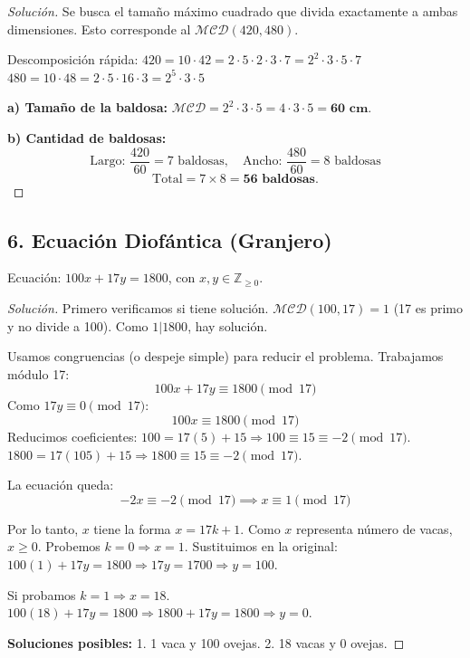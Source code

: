 \documentclass[12pt, letterpaper]{article}
\newenvironment{solucion}
    {\begin{proof}[Solución]}
    {\end{proof}}
\begin{document}
\begin{solucion}
    Se busca el tamaño máximo cuadrado que divida exactamente a ambas dimensiones. Esto corresponde al $\mathcal{MCD}(420, 480)$.
    
    Descomposición rápida:
    $420 = 10 \cdot 42 = 2 \cdot 5 \cdot 2 \cdot 3 \cdot 7 = 2^2 \cdot 3 \cdot 5 \cdot 7$
    $480 = 10 \cdot 48 = 2 \cdot 5 \cdot 16 \cdot 3 = 2^5 \cdot 3 \cdot 5$
    
    \textbf{a) Tamaño de la baldosa:}
    $\mathcal{MCD} = 2^2 \cdot 3 \cdot 5 = 4 \cdot 3 \cdot 5 = \mathbf{60 \text{ cm}}$.
    
    \textbf{b) Cantidad de baldosas:}
    \[ \text{Largo: } \frac{420}{60} = 7 \text{ baldosas}, \quad \text{Ancho: } \frac{480}{60} = 8 \text{ baldosas} \]
    \[ \text{Total} = 7 \times 8 = \mathbf{56 \text{ baldosas}}. \]
\end{solucion}

\subsection*{6. Ecuación Diofántica (Granjero)}
Ecuación: $100x + 17y = 1800$, con $x, y \in \mathbb{Z}_{\ge 0}$.

\begin{solucion}
    Primero verificamos si tiene solución. $\mathcal{MCD}(100, 17) = 1$ (17 es primo y no divide a 100). Como $1 | 1800$, hay solución.
    
    Usamos congruencias (o despeje simple) para reducir el problema. Trabajamos módulo 17:
    \[ 100x + 17y \equiv 1800 \pmod{17} \]
    Como $17y \equiv 0 \pmod{17}$:
    \[ 100x \equiv 1800 \pmod{17} \]
    Reducimos coeficientes:
    $100 = 17(5) + 15 \Rightarrow 100 \equiv 15 \equiv -2 \pmod{17}$.
    $1800 = 17(105) + 15 \Rightarrow 1800 \equiv 15 \equiv -2 \pmod{17}$.
    
    La ecuación queda:
    \[ -2x \equiv -2 \pmod{17} \implies x \equiv 1 \pmod{17} \]
    
    Por lo tanto, $x$ tiene la forma $x = 17k + 1$.
    Como $x$ representa número de vacas, $x \ge 0$.
    Probemos $k=0 \Rightarrow x=1$.
    Sustituimos en la original: $100(1) + 17y = 1800 \Rightarrow 17y = 1700 \Rightarrow y = 100$.
    
    Si probamos $k=1 \Rightarrow x=18$.
    $100(18) + 17y = 1800 \Rightarrow 1800 + 17y = 1800 \Rightarrow y = 0$.
    
    \textbf{Soluciones posibles:}
    1. 1 vaca y 100 ovejas.
    2. 18 vacas y 0 ovejas.
\end{solucion}
\end{document}
